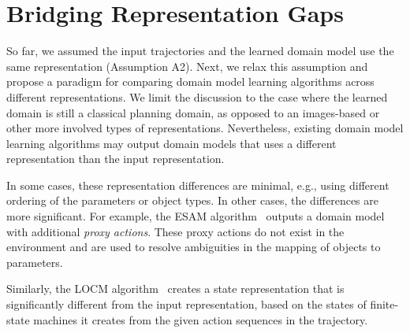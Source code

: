 \documentclass{article}
\theoremstyle{definition}
\theoremstyle{remark}
\newif\ifaddcomments
\newcommand{\roni}[1]{\ifaddcomments{\textcolor{red}{[Roni: #1]}}\fi}
\newcommand{\mauro}[1]{\ifaddcomments{\textcolor{green}{[Mauro: #1]}}\fi}
\newcommand{\yarin}[1]{\ifaddcomments{\textcolor{teal}{[Yarin: #1]}}\fi}
\begin{document}
\section{Bridging Representation Gaps}
\label{sec:bridging-gap}
So far, we assumed the input trajectories and the learned domain model use the same representation (Assumption A2). Next, we relax this assumption and propose a paradigm for comparing domain model learning algorithms across different representations. 
We limit the discussion to the case where the learned domain is still a classical planning domain, as opposed to an images-based or other more involved types of representations. 
Nevertheless, existing domain model learning algorithms may output domain models that uses a different representation than the input representation.

In some cases, these representation differences are minimal, e.g., using different ordering of the parameters or object types. 
In other cases, the differences are more significant. 
For example, the ESAM algorithm~\citep{juba2021safe} outputs a domain model with additional \emph{proxy actions}. 
These proxy actions do not exist in the environment and are used to resolve ambiguities in the mapping of objects to parameters.
\roni{@Pascal: you mentioned a related paper that learned macro actions. Can you add here a citation about it and maybe a sentence on how it relates?}
Similarly, the LOCM algorithm~\citep{cresswell2013acquiring} creates a state representation that is significantly different from the input representation, based on the states of finite-state machines it creates from the given action sequences in the trajectory. 
\roni{@All: More examples?}
\mauro{OpMaker2 generates classical planning models in OCL language \cite{mccluskey2010action}}
\roni{@Mauro: I read briefly the OpMaker2 and didn't fully understand. Can you write a sentence or two on this. It was not clear to me if OpMaker2 outputs a PDDL or something else.}
\end{document}
